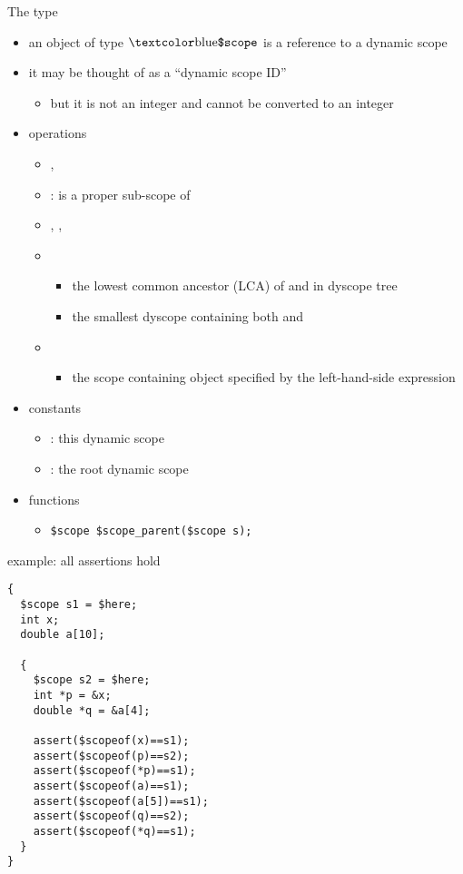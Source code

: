 \documentclass[t]{beamer}
\begin{document}
\begin{frame}[containsverbatim]{The \cscope{} type}
  \begin{itemize}
  \item an object of type $\cscope$ is a reference to a dynamic scope
  \item it may be thought of as a ``dynamic scope ID''
    \begin{itemize}
    \item but it is not an integer and cannot be converted to an
      integer
    \end{itemize}
  \item operations
    \begin{itemize}
    \item \code{==}, \code{!=}
    \item {} :  is a proper sub-scope of 
    \item \code{<=}, \code{>}, \code{>=}
    \item {}
      \begin{itemize}
      \item the lowest common ancestor (LCA) of  and 
        in dyscope tree
      \item the smallest dyscope containing both  and 
      \end{itemize}
    \item {}
      \begin{itemize}
      \item the scope containing object specified by the
        left-hand-side expression
      \end{itemize}
    \end{itemize}
  \item constants
    \begin{itemize}
    \item \chere: this dynamic scope
    \item \cscoperoot: the root dynamic scope
    \end{itemize}
  \item functions
    \begin{itemize}
    \item \verb!$scope $scope_parent($scope s);!
    \end{itemize}
  \end{itemize}
\end{frame}

\begin{frame}[containsverbatim]{\cscopeof{} example: all assertions hold}
  \begin{small}
\begin{verbatim}
{
  $scope s1 = $here;
  int x;
  double a[10];

  {
    $scope s2 = $here;
    int *p = &x;
    double *q = &a[4];

    assert($scopeof(x)==s1);
    assert($scopeof(p)==s2);
    assert($scopeof(*p)==s1);
    assert($scopeof(a)==s1);
    assert($scopeof(a[5])==s1);
    assert($scopeof(q)==s2);
    assert($scopeof(*q)==s1);
  }
}  
\end{verbatim}
  \end{small}
\end{frame}
\end{document}
